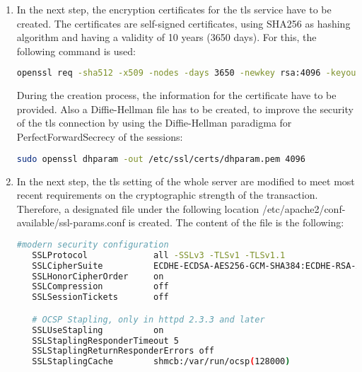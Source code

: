 \begin{enumerate}
  \item In the next step, the encryption certificates for the tls service have to be created. The certificates are self-signed certificates, using SHA256 as hashing algorithm and 
  having a validity of 10 years (3650 days). For this, the following command is used:
  \begin{lstlisting}[language=bash]
   openssl req -sha512 -x509 -nodes -days 3650 -newkey rsa:4096 -keyout /etc/ssl/private/[servername].key -out /etc/ssl/certs/[servername].crt
  \end{lstlisting}
  During the creation process, the information for the certificate have to be provided. Also a Diffie-Hellman file has to be created, to improve the security of the tls connection 
  by using the Diffie-Hellman paradigma for PerfectForwardSecrecy of the sessions:
  \begin{lstlisting}[language=bash]
   sudo openssl dhparam -out /etc/ssl/certs/dhparam.pem 4096
  \end{lstlisting}
  \item In the next step, the tls setting of the whole server are modified to meet most recent requirements on the cryptographic strength of the transaction. Therefore, a 
  designated file under the following location /etc/apache2/conf-available/ssl-params.conf is created. The content of the file is the following:
  \begin{lstlisting}[language=bash]
   #modern security configuration
   SSLProtocol             all -SSLv3 -TLSv1 -TLSv1.1
   SSLCipherSuite          ECDHE-ECDSA-AES256-GCM-SHA384:ECDHE-RSA-AES256-GCM-SHA384:ECDHE-ECDSA-CHACHA20-POLY1305:ECDHE-RSA-CHACHA20-POLY1305:ECDHE-ECDSA-AES128-GCM-SHA256:ECDHE-RSA-AES128-GCM-SHA256:ECDHE-ECDSA-AES256-SHA384:ECDHE-RSA-AES256-SHA384:ECDHE-ECDSA-AES128-SHA256:ECDHE-RSA-AES128-SHA256
   SSLHonorCipherOrder     on
   SSLCompression          off
   SSLSessionTickets       off

   # OCSP Stapling, only in httpd 2.3.3 and later
   SSLUseStapling          on
   SSLStaplingResponderTimeout 5
   SSLStaplingReturnResponderErrors off
   SSLStaplingCache        shmcb:/var/run/ocsp(128000)


\end{lstlisting}
\end{enumerate}
